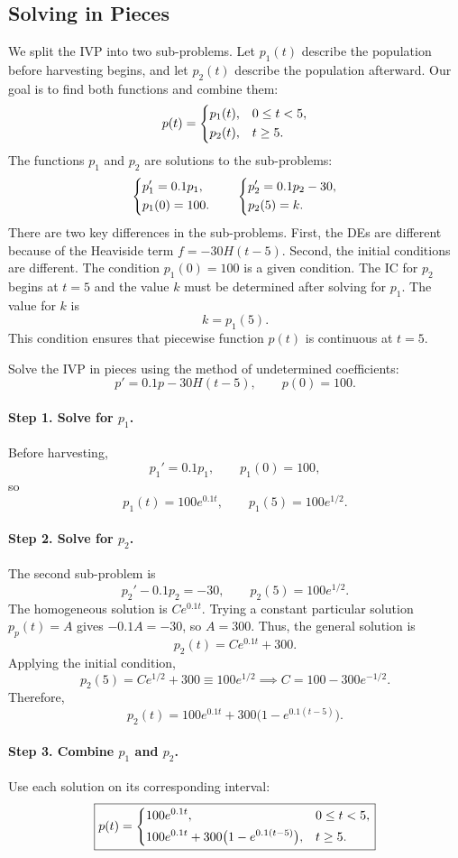 \documentclass[10pt,letterpaper]{article}
\begin{document}
\subsection{Solving in Pieces}

We split the IVP into two sub-problems. Let $p_1(t)$ describe
the population before harvesting begins, and let $p_2(t)$
describe the population afterward. Our goal is to find
both functions and combine them:
\[
p(t)=
\begin{dcases}
p_1(t), & 0\le t<5,\\
p_2(t), & t\ge5.
\end{dcases}
\]
The functions $p_1$ and $p_2$ are solutions to the sub-problems: 
\[
\begin{dcases}
p_1'=0.1 p_1,\\
p_1(0)=100.
\end{dcases} \qquad 
\begin{dcases}
p_2'=0.1 p_2-30,\\
p_2(5)=k.
\end{dcases}
\]
There are two key differences in the sub-problems. First, the DEs are different because of the Heaviside term $f=-30H(t-5)$. Second, the initial conditions are different. The condition $p_1(0)=100$ is a given condition. The IC for $p_2$ begins at $t=5$ and the value $k$ must be determined after solving for $p_1$. The value for $k$ is 
$$
    k = p_1(5).
$$
This condition ensures that piecewise function $p(t)$ is continuous at $t=5$.

\begin{example}[1]{
Solve the IVP in pieces using the method of
undetermined coefficients:
\[
p'=0.1p-30H(t-5),\qquad p(0)=100.
\]
}

\paragraph{Step 1. Solve for $p_1$.}
Before harvesting,
\[
p_1'=0.1p_1,\qquad p_1(0)=100,
\]
so
\[
p_1(t)=100e^{0.1t},
\qquad p_1(5)=100e^{1/2}.
\]

\paragraph{Step 2. Solve for $p_2$.}
The second sub-problem is
\[
p_2'-0.1p_2=-30,\qquad p_2(5)=100e^{1/2}.
\]
The homogeneous solution is $Ce^{0.1t}$. Trying a constant
particular solution $p_p(t)=A$ gives $-0.1A=-30$, so $A=300$.
Thus, the general solution is
\[
p_2(t)=Ce^{0.1t}+300.
\]
Applying the initial condition,
\[
p_2(5)=Ce^{1/2}+300\equiv100e^{1/2}
\implies C=100-300e^{-1/2}.
\]
Therefore,
\[
p_2(t)=100e^{0.1t}
+300\bigl(1-e^{0.1(t-5)}\bigr).
\]

\paragraph{Step 3. Combine $p_1$ and $p_2$.}
Use each solution on its corresponding interval:
\[
\boxed{
p(t)=
\begin{dcases}
100e^{0.1t}, & 0\le t<5,\\
100e^{0.1t}+300\bigl(1-e^{0.1(t-5)}\bigr),
& t\ge5.
\end{dcases}
}
\]
\end{example}
\end{document}
